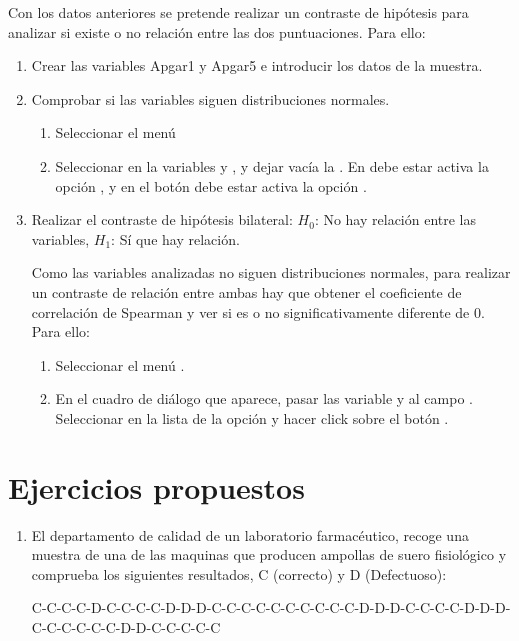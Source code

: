 \begin{description}
\begin{enumerate}[leftmargin=*]
Con los datos anteriores se pretende realizar un contraste de hipótesis para analizar si existe o no relación entre las dos puntuaciones. 
Para ello:
\begin{enumerate}
\item Crear las variables Apgar1 y Apgar5 e introducir los datos de la muestra.
\item Comprobar si las variables siguen distribuciones normales.
\begin{indicacion}
\begin{enumerate}
\item Seleccionar el menú 
\item Seleccionar en  la variables  y , y dejar vacía la . En  debe estar activa la opción , y en el botón  debe estar activa la opción .
\end{enumerate}
\end{indicacion}

\item Realizar el contraste de hipótesis bilateral: $H_0$: No hay relación entre las variables, $H_1$: Sí que hay relación.
\begin{indicacion}
Como las variables analizadas no siguen distribuciones normales, para realizar un contraste de relación entre ambas hay que obtener el coeficiente de correlación de Spearman y ver si es o no significativamente diferente de $0$. Para ello:
\begin{enumerate}
\item Seleccionar el menú . 
\item En el cuadro de diálogo que aparece, pasar las variable  y  al campo . Seleccionar en la lista de  la opción  y hacer click sobre el botón .
\end{enumerate}
\end{indicacion}
\end{enumerate}


\section{Ejercicios propuestos}
\begin{enumerate}
\item El departamento de calidad de un laboratorio farmacéutico, recoge una muestra de una de las maquinas que producen ampollas de suero fisiológico y comprueba los siguientes resultados, C (correcto) y D (Defectuoso):
\begin{center}
C-C-C-C-D-C-C-C-C-D-D-D-C-C-C-C-C-C-C-C-C-C-D-D-D-C-C-C-C-D-D-D-C-C-C-C-C-C-D-D-C-C-C-C-C
\end{center}


\end{enumerate}
\end{enumerate}
\end{description}
